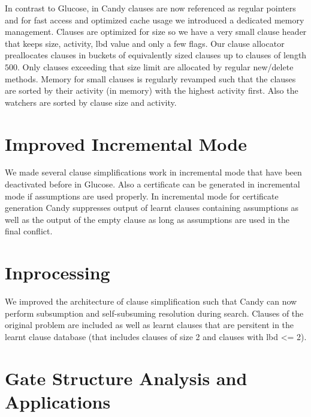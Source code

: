 \documentclass[conference]{IEEEtran}
\begin{document}
In contrast to Glucose, in Candy clauses are now referenced as regular pointers and for fast access and optimized cache usage we introduced a dedicated memory management. Clauses are optimized for size so we have a very small clause header that keeps size, activity, lbd value and only a few flags. Our clause allocator preallocates clauses in buckets of equivalently sized clauses up to clauses of length $500$. Only clauses exceeding that size limit are allocated by regular new/delete methods. Memory for small clauses is regularly revamped such that the clauses are sorted by their activity (in memory) with the highest activity first. Also the watchers are sorted by clause size and activity. 

\section{Improved Incremental Mode}

We made several clause simplifications work in incremental mode that have been deactivated before in Glucose. Also a certificate can be generated in incremental mode if assumptions are used properly. In incremental mode for certificate generation Candy suppresses output of learnt clauses containing assumptions as well as the output of the empty clause as long as assumptions are used in the final conflict. 

\section{Inprocessing}

We improved the architecture of clause simplification such that Candy can now perform subsumption and self-subsuming resolution during search. Clauses of the original problem are included as well as learnt clauses that are persitent in the learnt clause database (that includes clauses of size 2 and clauses with lbd <= 2). 

\section{Gate Structure Analysis and Applications}
\end{document}
